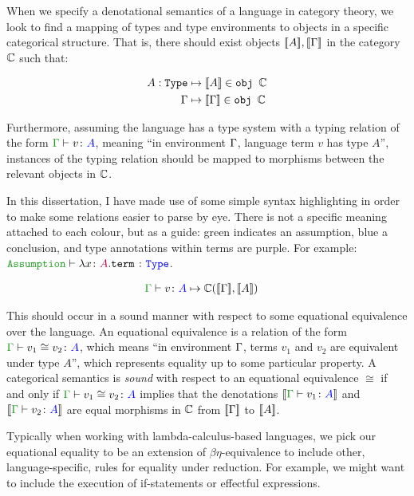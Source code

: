 \documentclass{Report}
\begin{document}
When we specify a denotational semantics of a language in category theory, we look to find a mapping of types and type environments to objects in a specific categorical structure.  That is, there should exist objects ${\bf [\![}A{\bf ]\!]}, {\bf [\![}\Gamma{\bf ]\!]}$ in the category $\mathbb{C}$ such that:

\begin{align*}
    A: \texttt{Type} & \mapsto {\bf [\![}A{\bf ]\!]} \in \texttt{obj } \mathbb{C} \\
    \Gamma & \mapsto  {\bf [\![}\Gamma{\bf ]\!]} \in \texttt{obj } \mathbb{C}
\end{align*}

Furthermore, assuming the language has a type system with a typing relation of the form $\gtyperelation{v}{A}$, meaning ``in environment $\Gamma$, language term $v$ has type $A$'', instances of the typing relation should be mapped to morphisms between the relevant objects in $\mathbb{C}$.

\begin{framed}
    \begin{aside}
        In this dissertation, I have made use of some simple syntax highlighting in order to make some relations easier to parse by eye. There is not a specific meaning attached to each colour, but as a guide: green indicates an assumption, blue a conclusion, and type annotations within terms are purple. For example: $\typerelation{\texttt{Assumption}}{\lam{x}{A}{\texttt{term}}}{\texttt{Type}}$.
    \end{aside}
     
\end{framed}

\begin{align*}
    \gtyperelation{v}{A} & \mapsto \C(\deno{\G}, \deno{A}) 
\end{align*}

This should occur in a sound manner with respect to some equational equivalence over the language. An equational equivalence is a relation of the form $\gtyperelation{v_1 \cong v_2}{A}$, which means ``in environment $\Gamma$, terms $v_1$ and $v_2$ are equivalent under type $A$'', which represents equality up to some particular property. A categorical semantics is \textit{sound} with respect to an equational equivalence $\cong$ if and only if $\gtyperelation{v_1 \cong v_2}{A}$ implies that the denotations $\deno{\gtyperelation{v_1}{A}}$ and $\deno{\gtyperelation{v_2}{A}}$ are equal morphisms in $\mathbb{C}$ from ${\bf [\![}\Gamma{\bf ]\!]}$ to ${\bf [\![}A{\bf ]\!]}$.

Typically when working with lambda-calculus-based languages, we pick our equational equality to be an extension of $\beta\eta$-equivalence to include other, language-specific, rules for equality under reduction. For example, we might want to include the execution of if-statements or effectful expressions.
\end{document}
